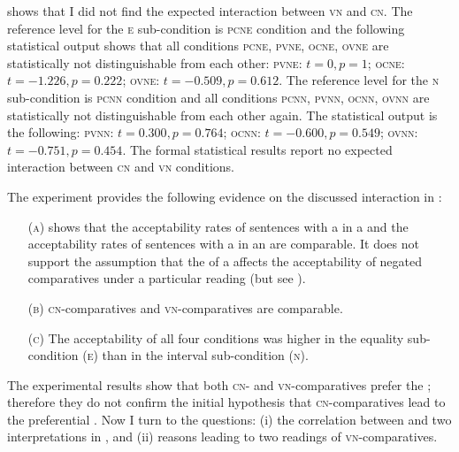 \documentclass[output=paper, colorlinks, citecolor=brown, newtxmath]{langsci/langscibook}
\begin{document}
 shows that I did not find the expected interaction between \textsc{vn} and \textsc{cn}. The reference level for the \textsc{e} sub-condition is \textsc{pcne} condition and the following statistical output shows that all conditions \textsc{pcne, pvne, ocne, ovne} are statistically not distinguishable from each other: \textsc{pvne:} $t= 0, p = 1$; \textsc{ocne:} $t=-1.226,p = 0.222$; \textsc{ovne:} $t = -0.509, p = 0.612$. The reference level for the \textsc{n} sub-condition is \textsc{pcnn} condition and all conditions \textsc{pcnn, pvnn, ocnn, ovnn} are statistically not distinguishable from each other again. The statistical output is the following: \textsc{pvnn:} $t = 0.300, p = 0.764$; \textsc{ocnn:} $t = -0.600, p = 0.549$; \textsc{ovnn:} $t = -0.751, p = 0.454$. The formal statistical results report no expected interaction between \textsc{cn} and \textsc{vn} conditions.

The experiment provides the following evidence on the discussed interaction in :

\begin{itemize}
\item[(\textsc{a})]  shows that the acceptability rates of sentences with a  in a  and the acceptability rates of sentences with a  in an  are comparable. It does not support the assumption that the  of a  affects the acceptability of negated comparatives under a particular reading
(but see \citealt{kadmon2001formal}).

\item[(\textsc{b})] \textsc{cn-}comparatives and \textsc{vn-}comparatives are comparable.

\item[(\textsc{c})] The acceptability of all four conditions was higher in the equality sub-condition (\textsc{e}) than in the interval sub-condition (\textsc{n}).
\end{itemize}

\noindent The experimental results show that both  \textsc{cn-} and \textsc{vn-}comparatives prefer the ; therefore they do not confirm the initial hypothesis that  \textsc{cn-}comparati\-ves lead to the preferential . Now I turn to the questions: (i) the correlation between  and two interpretations in , and (ii) reasons leading to two readings of  \textsc{vn-}comparatives.
\end{document}
